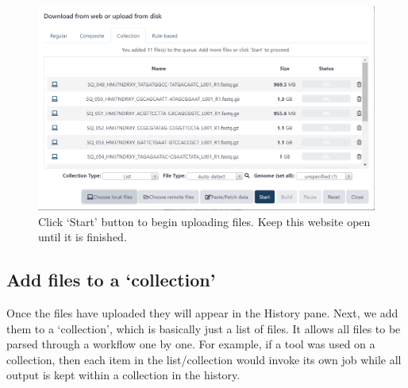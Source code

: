 \documentclass[
]{book}
\begin{document}
\begin{figure}

{\centering \includegraphics[width=1\linewidth]{images/image004} 

}

\caption{Click ‘Start’ button to begin uploading files. Keep this website open until it is finished.}\label{fig:chunk4}
\end{figure}

\hypertarget{add-files-to-a-collection}{%
\subsection{Add files to a `collection'}\label{add-files-to-a-collection}}

Once the files have uploaded they will appear in the History pane. Next, we add them to a `collection', which is basically just a list of files. It allows all files to be parsed through a workflow one by one. For example, if a tool was used on a collection, then each item in the list/collection would invoke its own job while all output is kept within a collection in the history.
\end{document}
